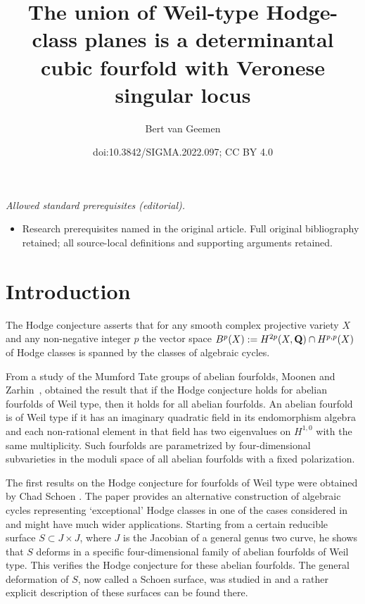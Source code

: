 \documentclass[10pt,a4paper]{amsart}
\title{The union of Weil-type Hodge-class planes is a determinantal cubic fourfold with Veronese singular locus}
\author{Bert van Geemen}
\date{doi:10.3842/SIGMA.2022.097; CC BY 4.0}
\numberwithin{equation}{section}
\begin{document}
\maketitle
\noindent\textit{Allowed standard prerequisites (editorial).}\begin{itemize}
\item Research prerequisites named in the original article. Full original bibliography retained; all source-local definitions and supporting arguments retained.
\end{itemize}\medskip
\section{Introduction}
The Hodge conjecture asserts that for any smooth complex projective variety $X$ and any
non-negative integer $p$ the vector space $B^p(X):=H^{2p}(X,{\bf Q})\cap H^{p,p}(X)$
of Hodge classes is spanned by the classes of algebraic cycles.

From a study of the Mumford Tate groups of abelian fourfolds, Moonen and Zarhin~\cite{MZ1,MZ2},
obtained the result that if the Hodge conjecture holds for abelian fourfolds of Weil type,
then it holds for all abelian fourfolds. An abelian fourfold is of Weil type if it has
an imaginary quadratic field in its endomorphism algebra
and each non-rational element in that field
has two eigenvalues on $H^{1,0}$ with the same multiplicity.
Such fourfolds are parametrized by four-dimensional subvarieties in the moduli space
of all abelian fourfolds with a fixed polarization.

The first results on the Hodge conjecture for fourfolds of Weil type were obtained
by Chad Schoen \cite{schoenhodge, Sadd}.
The paper \cite{schoen} provides an alternative
construction of algebraic cycles representing `exceptional' Hodge classes in
one of the cases considered in~\cite{schoenhodge}
and might have much wider applications.
Starting from a certain reducible surface $S\subset J\times J$,
where $J$ is the Jacobian of a general genus two curve, he shows that $S$ deforms
in a specific four-dimensional family of abelian fourfolds of Weil type.
This verifies the Hodge conjecture for these abelian fourfolds.
The general deformation of $S$, now called a Schoen surface,
was studied in \cite{CMLR, RRS} and a rather explicit description
of these surfaces can be found there.
\end{document}
